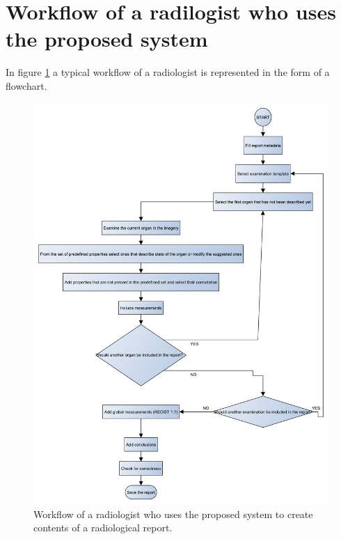 \documentclass[12pt, twoside, openany]{report}
\theoremstyle{definition}
\begin{document}
\section{Workflow of a radilogist who uses the proposed system}
In figure \ref{fig:report-workflow} a typical workflow of a radiologist is represented in the form of a flowchart. 
\begin{figure}
    \centering
    \includegraphics[width=\linewidth]{report-workflow.pdf}
    \caption{Workflow of a radiologist who uses the proposed system to create contents of a radiological report.
        \label{fig:report-workflow}
    }
\end{figure}
\end{document}
